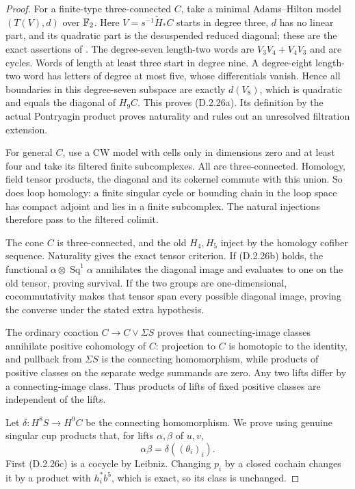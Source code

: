 \begin{proof}
For a finite-type three-connected $C$, take a minimal
Adams--Hilton model $(T(V),d)$ over $\mathbb F_2$.
Here $V=s^{-1}\widetilde H_*C$ starts in degree three, $d$ has
no linear part, and its quadratic part is the desuspended reduced
diagonal; these are the exact assertions of
\cite[\S3.1, p.300]{FGHHalperinLemaire1995}.
The degree-seven length-two words are $V_3V_4+V_4V_3$ and are
cycles. Words of length at least three start in degree nine.
A degree-eight length-two word has letters of degree at most five,
whose differentials vanish. Hence all boundaries in this
degree-seven subspace are exactly $d(V_8)$, which is quadratic
and equals the diagonal of $H_9C$. This proves
\textup{(D.2.26a)}. Its definition by the actual Pontryagin product
proves naturality and rules out an unresolved filtration extension.

For general $C$, use a CW model with cells only in dimensions zero
and at least four and take its filtered finite subcomplexes.
All are three-connected. Homology, field tensor products, the
diagonal and its cokernel commute with this union. So does loop
homology: a finite singular cycle or bounding chain in the loop
space has compact adjoint and lies in a finite subcomplex.
The natural injections therefore pass to the filtered colimit.

The cone $C$ is three-connected, and the old $H_4,H_5$ inject
by the homology cofiber sequence. Naturality gives the exact tensor
criterion. If \textup{(D.2.26b)} holds, the functional
$\alpha\otimes\operatorname{Sq}^1\alpha$ annihilates the
diagonal image and evaluates to one on the old tensor, proving
survival. If the two groups are one-dimensional, cocommutativity
makes that tensor span every possible diagonal image, proving
the converse under the stated extra hypothesis.

The ordinary coaction $C\to C\vee\Sigma S$ proves that
connecting-image classes annihilate positive cohomology of $C$:
projection to $C$ is homotopic to the identity, and pullback from
$\Sigma S$ is the connecting homomorphism, while products of
positive classes on the separate wedge summands are zero.
Any two lifts differ by a connecting-image class. Thus products
of lifts of fixed positive classes are independent of the lifts.

Let $\delta:H^8S\to H^9C$ be the connecting homomorphism.
We prove using genuine singular cup products that, for lifts
$\alpha,\beta$ of $u,v$,
\[
 \alpha\beta=\delta((\theta_i)_i).
 \tag{D.2.26f}
\]
First \textup{(D.2.26c)} is a cocycle by Leibniz. Changing $p_i$
by a closed cochain changes it by a product with $h_i^*b^5$,
which is exact, so its class is unchanged.


\end{proof}
